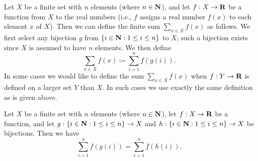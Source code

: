 \begin{definition}\label{7.1.6}
  Let \(X\) be a finite set with \(n\) elements (where \(n \in \mathbf{N}\)), and let \(f : X \to \mathbf{R}\) be a function from \(X\) to the real numbers
  (i.e., \(f\) assigns a real number \(f(x)\) to each element \(x\) of \(X\)).
  Then we can define the finite sum \(\sum_{x \in X} f(x)\) as follows.
  We first select any bijection \(g\) from \(\{i \in \mathbf{N} : 1 \leq i \leq n\}\) to \(X\);
  such a bijection exists since \(X\) is assumed to have \(n\) elements.
  We then define
  \[
    \sum_{x \in X} f(x) \coloneqq \sum_{i = 1}^n f(g(i)).
  \]
  In some cases we would like to define the sum \(\sum_{x \in X} f(x)\) when \(f : Y \to \mathbf{R}\) is defined on a larger set \(Y\) than \(X\).
  In such cases we use exactly the same definition as is given above.
\end{definition}

\setcounter{theorem}{7}
\begin{proposition}\label{7.1.8}
  Let \(X\) be a finite set with \(n\) elements (where \(n \in \mathbf{N}\)), let \(f : X \to \mathbf{R}\) be a function, and let \(g : \{i \in \mathbf{N} : 1 \leq i \leq n\} \to X\) and \(h : \{i \in \mathbf{N} : 1 \leq i \leq n\} \to X\) be bijections.
  Then we have
  \[
    \sum_{i = 1}^n f(g(i)) = \sum_{i = 1}^n f(h(i)).
  \]
\end{proposition}

